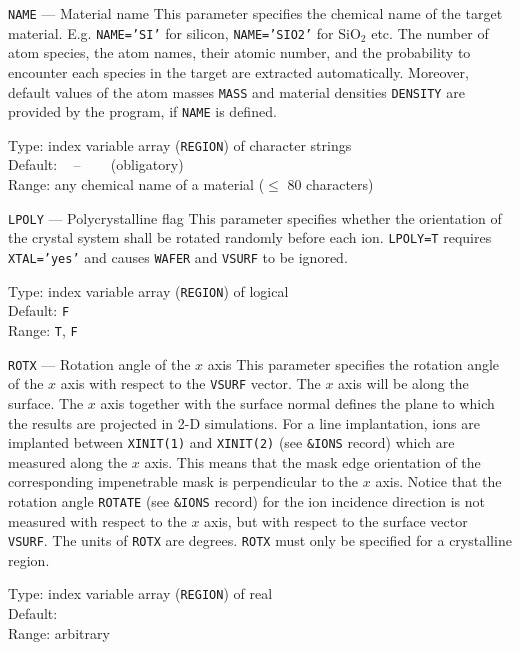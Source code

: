 \begin{keydescription}{\texttt{NAME} --- Material name}
%
  This parameter specifies the chemical name of the target material.
  E.g. \texttt{NAME='SI'} for silicon, \texttt{NAME='SIO2'} for
  SiO$_2$ etc. The number of atom species, the atom names, their
  atomic number, and the probability to encounter each species in the
  target are extracted automatically.  Moreover, default values of the
  atom masses \texttt{MASS} and material densities \texttt{DENSITY} are
  provided by the program, if \texttt{NAME} is defined.
%
  \begin{keytab}
    Type:    \> index variable array (\texttt{REGION}) of character strings \\
    Default: \> ~ -- ~~~ (obligatory) \\
    Range:   \> any chemical name of a material ($\le$ 80 characters)
  \end{keytab}
\end{keydescription}

\begin{keydescription}{\texttt{LPOLY} --- Polycrystalline flag}
%
  This parameter specifies whether the orientation of the crystal system
  shall be rotated randomly before each ion. \texttt{LPOLY=T} requires 
  \texttt{XTAL='yes'} and causes \texttt{WAFER} and \texttt{VSURF} to
  be ignored.
%
  \begin{keytab}
    Type:    \> index variable array (\texttt{REGION}) of logical \\
    Default: \> \texttt{F} \\
    Range:   \> \texttt{T}, \texttt{F}
  \end{keytab}
\end{keydescription}

\begin{keydescription}{\texttt{ROTX} --- Rotation angle of the $x$ axis}
%
  This parameter specifies the rotation angle of the $x$ axis with
  respect to the \texttt{VSURF} vector. The $x$ axis will be along the
  surface. The $x$ axis together with the surface normal defines the
  plane to which the results are projected in 2-D simulations. For a
  line implantation, ions are implanted between \texttt{XINIT(1)} and
  \texttt{XINIT(2)} (see \texttt{\&IONS} record) which are measured
  along the $x$ axis. This means that the mask edge orientation of the
  corresponding impenetrable mask is perpendicular to the $x$ axis.
  Notice that the rotation angle \texttt{ROTATE} (see \texttt{\&IONS}
  record) for the ion incidence direction is not measured with respect
  to the $x$ axis, but with respect to the surface vector
  \texttt{VSURF}.  The units of \texttt{ROTX} are degrees.
  \texttt{ROTX} must only be specified for a crystalline region.
%
  \begin{keytab}
    Type:    \> index variable array (\texttt{REGION}) of real \\
    Default:  \\
    Range:   \> arbitrary
  \end{keytab}
\end{keydescription}

